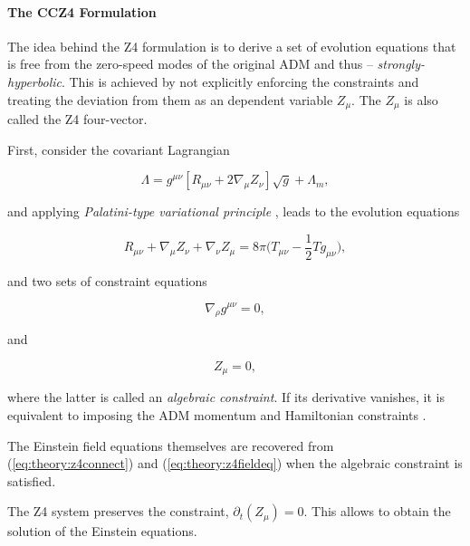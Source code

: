 {    
    \paragraph{The CCZ4 Formulation}
    
    
    The idea behind the Z4 formulation is to derive a set of evolution equations that is free from the zero-speed modes of the original ADM and thus -- \textit{strongly-hyperbolic}. 
    This is achieved by not explicitly enforcing the constraints and treating the deviation from them as an dependent variable $Z_{\mu}$. The $Z_{\mu}$ is also called the Z4 four-vector.
    
    First, consider the covariant Lagrangian
    
    \begin{equation}
    \Lambda = g^{\mu\nu}[R_{\mu\nu} + 2\nabla_{\mu}Z_{\nu}]\sqrt{g} + \Lambda_m,
    \end{equation}
    
    and applying \textit{Palatini-type variational principle} \cite{Bona:2010is}, leads to the evolution equations
    
    \begin{equation}
    R_{\mu\nu} + \nabla_{\mu}Z_{\nu} + \nabla_{\nu}Z_{\mu}=8\pi\Big(T_{\mu\nu} - \frac{1}{2}Tg_{\mu\nu}\Big),
    \label{eq:theory:z4fieldeq}
    \end{equation}
    
    and two sets of constraint equations
    
    \begin{equation}
    \nabla_{\rho} g^{\mu\nu} = 0, 
    \label{eq:theory:z4connect}
    \end{equation}
    
    and
    
    \begin{equation}
    Z_{\mu} = 0,
    \end{equation}
    
    where the latter is called an \textit{algebraic constraint}. 
    If its derivative vanishes, it is equivalent to imposing the ADM momentum and Hamiltonian constraints \cite{Bona:2009}. 
    
    The Einstein field equations themselves are recovered from (\ref{eq:theory:z4connect}) and (\ref{eq:theory:z4fieldeq}) when the algebraic constraint is satisfied. 
    
    The Z4 system preserves the constraint, $\partial_t (Z_{\mu})= 0$. 
    This allows to obtain the solution of the Einstein equations. 
    
}
